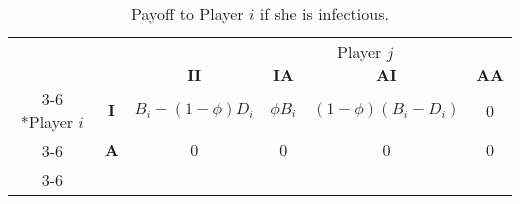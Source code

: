 \documentclass{article}
\theoremstyle{definition}
\theoremstyle{exercise}
\theoremstyle{remark}
\begin{document}
  \begin{table}[H]
      \centering
    \setlength{\extrarowheight}{2pt}
    \begin{tabular}{cc|c|c|c|c|}
        & \multicolumn{1}{c}{} & \multicolumn{1}{c}{} & \multicolumn{2}{c}{Player $j$} & \multicolumn{1}{c}{}\\
        & \multicolumn{1}{c}{} & \multicolumn{1}{c}{$\bm{II}$}  & \multicolumn{1}{c}{$\bm{IA}$} & \multicolumn{1}{c}{$\bm{AI}$}& \multicolumn{1}{c}{$\bm{A A}$}\\\cline{3-6}
        \multirow{2}*{Player $i$}  & $\bm{I}$ & $B_i - (1 - \phi) D_i$ & $\phi B_i$ & $(1 - \phi)(B_i - D_i)$ & 0 \\\cline{3-6}
        & $\bm{A}$ & $0$ & $0$ & $0$& $0$\\\cline{3-6}
    \end{tabular}
    \caption{Payoff to Player $i$ if she is infectious.}
  \end{table}
\end{document}
